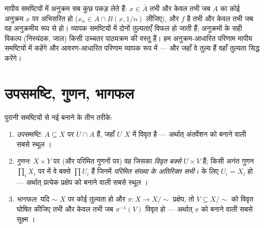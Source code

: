 \begin{remark}\label{rem:b3:topology:sequences}
मापीय समष्टियों में अनुक्रम सब कुछ पकड़ लेते हैं: $x \in \bar A$ तभी और
केवल तभी जब $A$ का कोई अनुक्रम $x$ पर अभिसरित हो ($x_n \in A \cap
B(x, 1/n)$ लीजिए),
और $f$  है तभी और केवल तभी जब वह अनुक्रमीय रूप से  हो।
व्यापक समष्टियों में दोनों तुल्यताएँ विफल हो जाती हैं; अनुक्रमों
के सही विकल्प (निस्यंदक, जाल) किसी उच्चतर पाठ्यक्रम की वस्तु हैं।
हम अनुक्रम-आधारित परिणाम मापीय समष्टियों में कहेंगे और आवरण-आधारित
परिणाम व्यापक रूप में --- और जहाँ वे तुल्य हैं वहाँ तुल्यता सिद्ध
करेंगे।
\end{remark}

\section{उपसमष्टि, गुणन, भागफल}

\begin{definition}\label{def:b3:topology:constructions}
पुरानी समष्टियों से नई बनाने के तीन तरीके:
\begin{enumerate}
  \item \emph{उपसमष्टि}: $A \subseteq X$ पर  $U \cap A$ हैं, जहाँ
        $U$ $X$ में विवृत है --- अर्थात् अंतर्वेशन को 
        बनाने वाली सबसे स्थूल ।
  \item \emph{गुणन}: $X \times Y$ पर (और परिमित गुणनों पर) वह 
        जिसका  \emph{विवृत बक्से} $U \times
        V$ हैं; किसी अनंत गुणन
        $\prod_i X_i$ पर  में वे बक्से $\prod U_i$ हैं जिनमें \emph{परिमित
        संख्या के अतिरिक्त सभी} $i$ के लिए $U_i = X_i$ हो ---
        अर्थात् प्रत्येक प्रक्षेप को  बनाने वाली सबसे स्थूल
        ।
  \item \emph{भागफल}: यदि $\sim$ $X$ पर कोई तुल्यता हो और
        $\pi\colon X \to X/{\sim}$ प्रक्षेप, तो $V
        \subseteq X/{\sim}$ को विवृत घोषित कीजिए तभी और
        केवल तभी जब $\pi^{-1}(V)$ विवृत हो --- अर्थात् $\pi$ को 
        बनाने वाली सबसे सूक्ष्म ।
\end{enumerate}
\end{definition}

